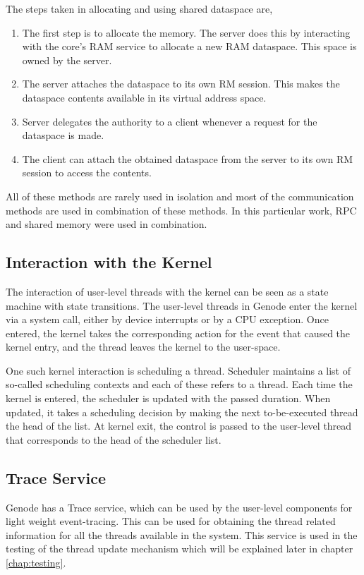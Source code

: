 The steps taken in allocating and using shared dataspace are,
\begin{enumerate}
\item The first step is to allocate the memory. The server does this by interacting with the core's RAM service to allocate a new RAM dataspace. This space is owned by the server.

\item The server attaches the dataspace to its own RM session. This makes the dataspace contents available in its virtual address space.

\item Server delegates the authority to a client whenever a request for the dataspace is made.

\item The client can attach the obtained dataspace from the server to its own RM session to access the contents.
\end{enumerate}

All of these methods are rarely used in isolation and most of the communication methods are used in combination of these methods. In this particular work, RPC and shared memory were used in combination.

\subsection{Interaction with the Kernel}
The interaction of user-level threads with the kernel can be seen as a state machine with state transitions. The user-level threads in Genode enter the kernel via a system call, either by device interrupts or by a CPU exception. Once entered, the kernel takes the corresponding action for the event that caused the kernel entry, and the thread leaves the kernel to the user-space.

One such kernel interaction is scheduling a thread. Scheduler maintains a list of so-called scheduling contexts and each of these refers to a thread. Each time the kernel is entered, the scheduler is updated with the passed duration. When updated, it takes a scheduling decision by making the next to-be-executed thread the head of the list. At kernel exit, the control is passed to the user-level thread that corresponds to the head of the scheduler list.

\subsection{Trace Service}
Genode has a Trace service, which can be used by the user-level components for light weight event-tracing. This can be used for obtaining the thread related information for all the threads available in the system. This service is used in the testing of the thread update mechanism which will be explained later in chapter \ref{chap:testing}.

